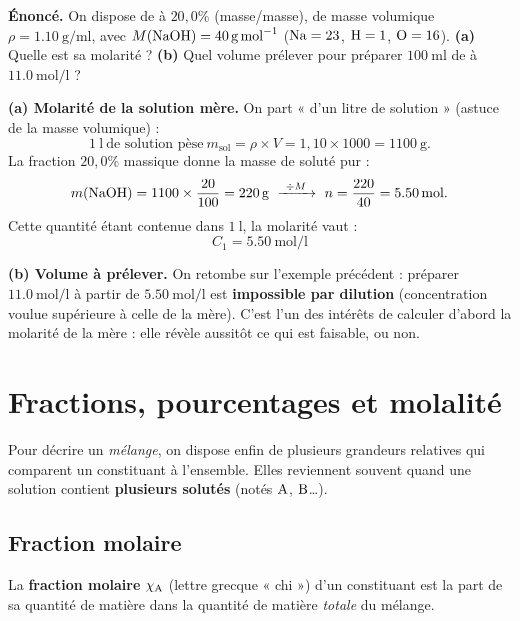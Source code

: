 \documentclass[11pt,a4paper]{article}
\begin{document}
\begin{exemple}\label{ex:naoh}
\textbf{Énoncé.} On dispose de  à $20{,}0\%$ (masse/masse), de masse volumique
$\rho = \SI{1.10}{\gram\per\milli\litre}$, avec $M(\ce{NaOH}) = \SI{40}{\gram\per\mole}$
($\ce{Na}=23$, $\ce{H}=1$, $\ce{O}=16$). \textbf{(a)} Quelle est sa molarité ? \textbf{(b)} Quel
volume prélever pour préparer $\SI{100}{\milli\litre}$ de  à $\SI{11.0}{\mole\per\litre}$ ?

\smallskip
\textbf{(a) Molarité de la solution mère.} On part « d'un litre de solution » (astuce de la masse
volumique) :
\[ \SI{1}{\litre}\ \text{de solution pèse}\ m_{\text{sol}} = \rho\times V = 1{,}10 \times 1000 = \SI{1100}{\gram}. \]
La fraction $20{,}0\%$ massique donne la masse de soluté pur :
\[ m(\ce{NaOH}) = 1100 \times \frac{20}{100} = \SI{220}{\gram}\ \xrightarrow{\ \div M\ }\
   n = \frac{220}{40} = \SI{5.50}{\mole}. \]
Cette quantité étant contenue dans $\SI{1}{\litre}$, la molarité vaut :
\[ \boxed{C_1 = \SI{5.50}{\mole\per\litre}} \]

\textbf{(b) Volume à prélever.} On retombe sur l'exemple précédent : préparer $\SI{11.0}{\mole\per\litre}$
à partir de $\SI{5.50}{\mole\per\litre}$ est \textbf{impossible par dilution} (concentration voulue
supérieure à celle de la mère). C'est l'un des intérêts de calculer d'abord la molarité de la mère :
elle révèle aussitôt ce qui est faisable, ou non.
\end{exemple}

\section{Fractions, pourcentages et molalité}
Pour décrire un \emph{mélange}, on dispose enfin de plusieurs grandeurs \og relatives \fg{} qui
comparent un constituant à l'ensemble. Elles reviennent souvent quand une solution contient
\textbf{plusieurs solutés} (notés $\ce{A}$, $\ce{B}$\ldots).

\subsection{Fraction molaire}

\begin{definition}
La \textbf{fraction molaire} $\chi_{}$ (lettre grecque « chi ») d'un constituant \ce{A} est la
part de sa quantité de matière dans la quantité de matière \emph{totale} du mélange.
\end{definition}
\end{document}
